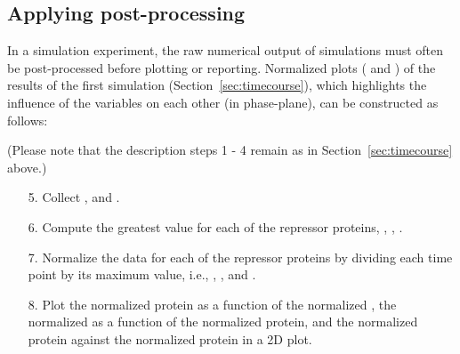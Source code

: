 \subsection{Applying post-processing}
\label{sec:postprocessing}
In a simulation experiment, the raw numerical output of simulations must often be post-processed before plotting or reporting. Normalized plots ( and ) of the results of the first simulation (Section~\ref{sec:timecourse}), which highlights the influence of the variables on each other (in phase-plane), can be constructed as follows:

(Please note that the description steps 1 - 4 remain as in Section~\ref{sec:timecourse} above.)
\begin{enumerate}
	\item[5.]{Collect ,  and .}
	\item[6.]{Compute the greatest value for each of the repressor proteins, , , .}
	\item[7.]{Normalize the data for each of the repressor proteins by dividing each time point by its maximum value, i.e., , , and .}
	\item[8.]{Plot the normalized  protein as a function of the normalized , the normalized  as a function of the normalized  protein, and the normalized  protein against the normalized  protein in a 2D plot.}
\end{enumerate}

